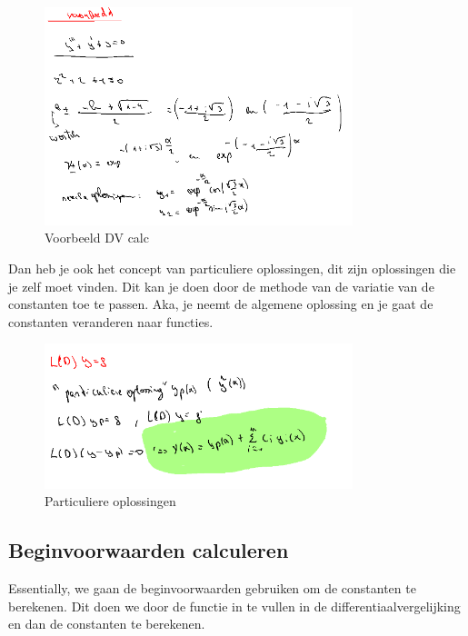 \documentclass[a4paper]{report}
\begin{document}
\begin{figure}[H]
	\centering
	\includegraphics[width=0.8\textwidth]{assets/voorbeeld_dv_calc.png}
	\caption{Voorbeeld DV calc}
	\label{fig:voorbeeld_dv_calc}
\end{figure}

Dan heb je ook het concept van particuliere oplossingen, dit zijn oplossingen die je zelf moet vinden. Dit kan je doen door de methode van de variatie van de constanten toe te passen.
Aka, je neemt de algemene oplossing en je gaat de constanten veranderen naar functies.

\begin{figure}[H]
	\centering
	\includegraphics[width=0.8\textwidth]{assets/particuliere_oplossingen.png}
	\caption{Particuliere oplossingen}
	\label{fig:particuliere_oplossingen}
\end{figure}

\subsection{Beginvoorwaarden calculeren}

Essentially, we gaan de beginvoorwaarden gebruiken om de constanten te berekenen. Dit doen we door de functie in te vullen in de differentiaalvergelijking en dan de constanten te berekenen.
\end{document}
